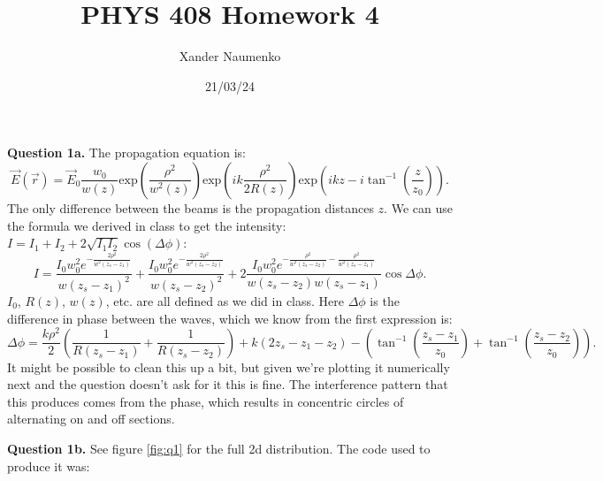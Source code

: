 \documentclass[letterpaper, reqno,11pt]{article}
\begin{document}
\title{PHYS 408 Homework 4}
\date{21/03/24}
\author{Xander Naumenko}
\maketitle

{\medskip\noindent\bf Question 1a.} The propagation equation is:
\[
\vec E(\vec r)=\vec E_0 \frac{w_0}{w(z)}\text{exp}\left( \frac{\rho^2}{w^2(z)} \right) \text{exp}\left( ik \frac{\rho^2}{2R(z)} \right) \text{exp}\left( ikz-i\tan^{-1}\left( \frac{z}{z_0} \right)  \right) 
.\]
The only difference between the beams is the propagation distances $z$. We can use the formula we derived in class to get the intensity: $I=I_1+I_2+2\sqrt{I_1I_2}\cos(\Delta\phi)$:
\[
I=\frac{I_0w_0^2e^{-\frac{2\rho^2}{w^2(z_s-z_1)}}}{w(z_s-z_1)^2}+\frac{I_0w_0^2e^{-\frac{2\rho^2}{w^2(z_s-z_2)}}}{w(z_s-z_2)^2}+2\frac{I_0w_0^2e^{-\frac{\rho^2}{w^2(z_s-z_2)}-\frac{\rho^2}{w^2(z_s-z_1)}}}{w(z_s-z_2)w(z_s-z_1)}\cos\Delta\phi
.\]
$I_0$, $R(z)$, $w(z)$, etc. are all defined as we did in class. Here $\Delta\phi$ is the difference in phase between the waves, which we know from the first expression is:
\[
    \Delta\phi=\frac{k\rho^2}{2}\left( \frac{1}{R(z_s-z_1)}+\frac{1}{R(z_s-z_2)} \right)+k\left( 2z_s-z_1-z_2 \right)-\left( \tan^{-1}\left( \frac{z_s-z_1}{z_0} \right) +\tan^{-1}\left( \frac{z_s-z_2}{z_0} \right) \right) 
.\]
It might be possible to clean this up a bit, but given we're plotting it numerically next and the question doesn't ask for it this is fine. The interference pattern that this produces comes from the phase, which results in concentric circles of alternating on and off sections.

{\medskip\noindent\bf Question 1b.} See figure \ref{fig:q1} for the full 2d distribution. The code used to produce it was:
\end{document}
